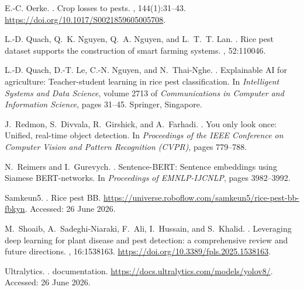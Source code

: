 ﻿\documentclass[11pt]{article}
\begin{document}
\begin{thebibliography}{}
E.-C. Oerke.
.
\newblock Crop losses to pests.
, 144(1):31--43.
\newblock \url{https://doi.org/10.1017/S0021859605005708}.

L.-D. Quach, Q.~K. Nguyen, Q.~A. Nguyen, and L.~T.~T. Lan.
.
\newblock Rice pest dataset supports the construction of smart farming systems.
, 52:110046.

L.-D. Quach, D.-T. Le, C.-N. Nguyen, and N.~Thai-Nghe.
.
\newblock Explainable {AI} for agriculture: Teacher-student learning in rice pest classification.
\newblock In {\em Intelligent Systems and Data Science}, volume 2713 of {\em Communications in Computer and Information Science}, pages 31--45. Springer, Singapore.

J.~Redmon, S.~Divvala, R.~Girshick, and A.~Farhadi.
.
\newblock You only look once: Unified, real-time object detection.
\newblock In {\em Proceedings of the IEEE Conference on Computer Vision and Pattern Recognition (CVPR)}, pages 779--788.

N.~Reimers and I.~Gurevych.
.
\newblock Sentence-{BERT}: Sentence embeddings using {Siamese} {BERT}-networks.
\newblock In {\em Proceedings of EMNLP-IJCNLP}, pages 3982--3992.

Samkeun5.
.
\newblock Rice pest {BB}.
\newblock \url{https://universe.roboflow.com/samkeun5/rice-pest-bb-fbkyn}. Accessed: 26 June 2026.

M.~Shoaib, A.~Sadeghi-Niaraki, F.~Ali, I.~Hussain, and S.~Khalid.
.
\newblock Leveraging deep learning for plant disease and pest detection: a comprehensive review and future directions.
, 16:1538163.
\newblock \url{https://doi.org/10.3389/fpls.2025.1538163}.

Ultralytics.
.
 documentation.
\newblock \url{https://docs.ultralytics.com/models/yolov8/}. Accessed: 26 June 2026.


\end{thebibliography}
\end{document}
